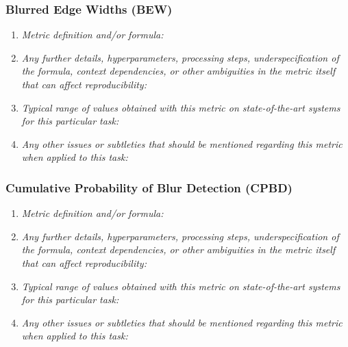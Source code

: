 \documentclass[a4paper,11pt]{article}
\begin{document}
        \subsubsection{Blurred Edge Widths (BEW)}
            \begin{enumerate}[label=\alph*.]
                \item \textit{Metric definition and/or formula:}
                \bigskip
                \item \textit{Any further details, hyperparameters, processing steps, underspecification of the formula, context dependencies, or other ambiguities in the metric itself that can affect reproducibility:}
                \bigskip
                \item \textit{Typical range of values obtained with this metric on state-of-the-art systems for this particular task:}
                \bigskip
                \item \textit{Any other issues or subtleties that should be mentioned regarding this metric when applied to this task:}
                \bigskip
            \end{enumerate}
        \subsubsection{Cumulative Probability of Blur Detection (CPBD)}
            \begin{enumerate}[label=\alph*.]
                \item \textit{Metric definition and/or formula:}
                \bigskip
                \item \textit{Any further details, hyperparameters, processing steps, underspecification of the formula, context dependencies, or other ambiguities in the metric itself that can affect reproducibility:}
                \bigskip
                \item \textit{Typical range of values obtained with this metric on state-of-the-art systems for this particular task:}
                \bigskip
                \item \textit{Any other issues or subtleties that should be mentioned regarding this metric when applied to this task:}
                \bigskip
            \end{enumerate}
\end{document}
